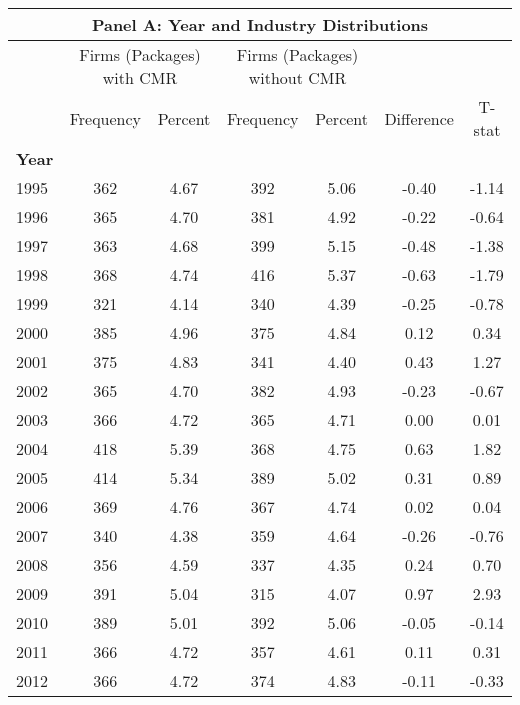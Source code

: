 \begin{tabular}{lcccccc} \toprule
    \multicolumn{7}{c}{\small \centering \textbf{Panel A}: Year and Industry Distributions} \\ \midrule
    & \multicolumn{2}{c}{Firms (Packages) with CMR} & \multicolumn{2}{c}{Firms (Packages) without CMR} & & \\
    & Frequency & Percent & Frequency & Percent & Difference & T-stat \\
    \cmidrule(lr){2-3}\cmidrule(lr){4-5}\cmidrule(lr){6-7}
    \textbf{Year}& & & & & & \\
    1995 & 362  &   4.67  &    392  &   5.06  &  -0.40  &     -1.14 \\
    1996 & 365  &   4.70  &    381  &   4.92  &  -0.22  &     -0.64 \\
    1997 & 363  &   4.68  &    399  &   5.15  &  -0.48  &     -1.38 \\
    1998 & 368  &   4.74  &    416  &   5.37  &  -0.63  &     -1.79 \\
    1999 & 321  &   4.14  &    340  &   4.39  &  -0.25  &     -0.78 \\
    2000 & 385  &   4.96  &    375  &   4.84  &   0.12  &      0.34 \\
    2001 & 375  &   4.83  &    341  &   4.40  &   0.43  &      1.27 \\
    2002 & 365  &   4.70  &    382  &   4.93  &  -0.23  &     -0.67 \\
    2003 & 366  &   4.72  &    365  &   4.71  &   0.00  &      0.01 \\
    2004 & 418  &   5.39  &    368  &   4.75  &   0.63  &      1.82 \\
    2005 & 414  &   5.34  &    389  &   5.02  &   0.31  &      0.89 \\
    2006 & 369  &   4.76  &    367  &   4.74  &   0.02  &      0.04 \\
    2007 & 340  &   4.38  &    359  &   4.64  &  -0.26  &     -0.76 \\
    2008 & 356  &   4.59  &    337  &   4.35  &   0.24  &      0.70 \\
    2009 & 391  &   5.04  &    315  &   4.07  &   0.97  &      2.93 \\
    2010 & 389  &   5.01  &    392  &   5.06  &  -0.05  &     -0.14 \\
    2011 & 366  &   4.72  &    357  &   4.61  &   0.11  &      0.31 \\
    2012 & 366  &   4.72  &    374  &   4.83  &  -0.11  &     -0.33 \\

\end{tabular}
